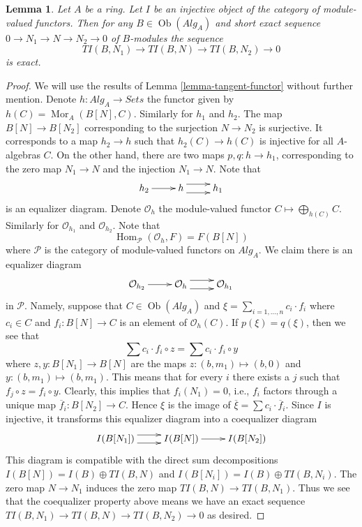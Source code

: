 \documentclass{stacks-project}
\theoremstyle{plain}
\newtheorem{lemma}[subsection]{Lemma}
\theoremstyle{definition}
\theoremstyle{remark}
\numberwithin{equation}{subsection}
\def\Hom{\mathop{\mathrm{Hom}}\nolimits}
\def\Mor{\mathop{\mathrm{Mor}}\nolimits}
\def\Ob{\mathop{\mathrm{Ob}}\nolimits}
\begin{document}
\begin{lemma}
\label{lemma-tangent-injective}
Let $A$ be a ring. Let $I$ be an injective object of the category
of module-valued functors. Then for any $B \in \Ob(\textit{Alg}_A)$
and short exact sequence
$0 \to N_1 \to N \to N_2 \to 0$
of $B$-modules the sequence
$$
TI(B, N_1) \to TI(B, N) \to TI(B, N_2) \to 0
$$
is exact.
\end{lemma}

\begin{proof}
We will use the results of
Lemma \ref{lemma-tangent-functor}
without further mention.
Denote $h : \textit{Alg}_A \to \textit{Sets}$ the functor given by
$h(C) = \Mor_A(B[N], C)$. Similarly for $h_1$ and $h_2$.
The map $B[N] \to B[N_2]$ corresponding to the surjection $N \to N_2$
is surjective. It corresponds to a map $h_2 \to h$ such that
$h_2(C) \to h(C)$ is injective for all $A$-algebras $C$. On the other
hand, there are two maps $p, q : h \to h_1$, corresponding to the
zero map $N_1 \to N$ and the injection $N_1 \to N$. Note that
$$
\xymatrix{
h_2 \ar[r] & h \ar@<1ex>[r] \ar@<-1ex>[r] & h_1
}
$$
is an equalizer diagram. Denote $\mathcal{O}_h$ the module-valued functor
$C \mapsto \bigoplus_{h(C)} C$. Similarly for $\mathcal{O}_{h_1}$ and
$\mathcal{O}_{h_2}$. Note that
$$
\Hom_\mathcal{P}(\mathcal{O}_h, F) = F(B[N])
$$
where $\mathcal{P}$ is the category of module-valued functors on
$\textit{Alg}_A$. We claim there is an equalizer diagram
$$
\xymatrix{
\mathcal{O}_{h_2} \ar[r] &
\mathcal{O}_h \ar@<1ex>[r] \ar@<-1ex>[r] &
\mathcal{O}_{h_1}
}
$$
in $\mathcal{P}$. Namely, suppose that $C \in \Ob(\textit{Alg}_A)$
and $\xi = \sum_{i = 1, \ldots, n} c_i \cdot f_i$ where $c_i \in C$ and
$f_i : B[N] \to C$ is an element of
$\mathcal{O}_h(C)$. If $p(\xi) = q(\xi)$, then
we see that
$$
\sum c_i \cdot f_i \circ z = \sum c_i \cdot f_i \circ y
$$
where $z, y : B[N_1] \to B[N]$ are the maps $z : (b, m_1) \mapsto (b, 0)$
and $y : (b, m_1) \mapsto (b, m_1)$. This means that for every $i$
there exists a $j$ such that $f_j \circ z = f_i \circ y$. Clearly, this
implies that $f_i(N_1) = 0$, i.e., $f_i$ factors through a unique map
$\overline{f}_i : B[N_2] \to C$. Hence $\xi$ is the image of
$\overline{\xi} = \sum c_i \cdot \overline{f}_i$.
Since $I$ is injective, it transforms this equalizer diagram
into a coequalizer diagram
$$
\xymatrix{
I(B[N_1]) \ar@<1ex>[r] \ar@<-1ex>[r] &
I(B[N]) \ar[r] &
I(B[N_2])
}
$$
This diagram is compatible with the direct sum decompositions
$I(B[N]) = I(B) \oplus TI(B, N)$ and $I(B[N_i]) = I(B) \oplus TI(B, N_i)$.
The zero map $N \to N_1$ induces the zero map $TI(B, N) \to TI(B, N_1)$.
Thus we see that the coequalizer property
above means we have an exact sequence
$TI(B, N_1) \to TI(B, N) \to TI(B, N_2) \to 0$
as desired.
\end{proof}
\end{document}
